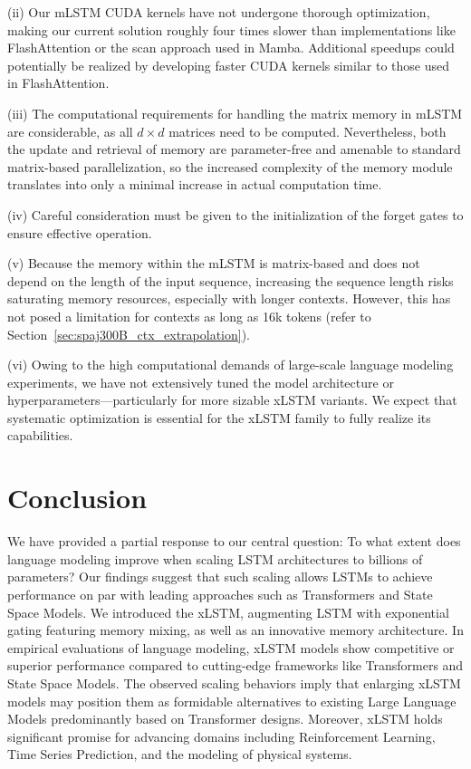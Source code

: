 (ii) Our mLSTM CUDA kernels have not undergone thorough optimization, making our current solution roughly four times slower than implementations like FlashAttention or the scan approach used in Mamba. Additional speedups could potentially be realized by developing faster CUDA kernels similar to those used in FlashAttention.

(iii) The computational requirements for handling the matrix memory in mLSTM are considerable, as all $d \times d$ matrices need to be computed. Nevertheless, both the update and retrieval of memory are parameter-free and amenable to standard matrix-based parallelization, so the increased complexity of the memory module translates into only a minimal increase in actual computation time.

(iv) Careful consideration must be given to the initialization of the forget gates to ensure effective operation.

(v) Because the memory within the mLSTM is matrix-based and does not depend on the length of the input sequence, increasing the sequence length risks saturating memory resources, especially with longer contexts. However, this has not posed a limitation for contexts as long as 16k tokens (refer to Section~\ref{sec:spaj300B_ctx_extrapolation}).

(vi) Owing to the high computational demands of large-scale language modeling experiments, we have not extensively tuned the model architecture or hyperparameters—particularly for more sizable xLSTM variants. We expect that systematic optimization is essential for the xLSTM family to fully realize its capabilities.

\section{Conclusion}
We have provided a partial response to our central question: To what extent does language modeling improve when scaling LSTM architectures to billions of parameters? Our findings suggest that such scaling allows LSTMs to achieve performance on par with leading approaches such as Transformers and State Space Models. We introduced the xLSTM, augmenting LSTM with exponential gating featuring memory mixing, as well as an innovative memory architecture. In empirical evaluations of language modeling, xLSTM models show competitive or superior performance compared to cutting-edge frameworks like Transformers and State Space Models. The observed scaling behaviors imply that enlarging xLSTM models may position them as formidable alternatives to existing Large Language Models predominantly based on Transformer designs. Moreover, xLSTM holds significant promise for advancing domains including Reinforcement Learning, Time Series Prediction, and the modeling of physical systems.

